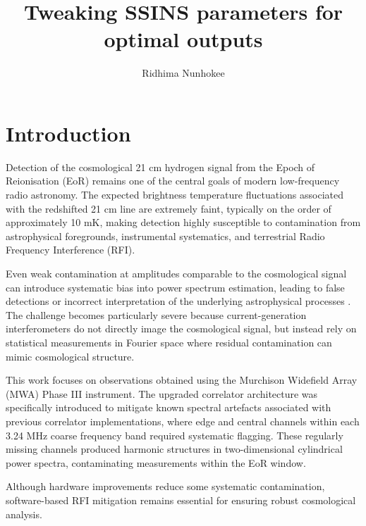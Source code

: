\documentclass{article}
\title{Tweaking SSINS parameters for optimal outputs}
\author{Ridhima Nunhokee}
\date{}
\begin{document}
\maketitle

\section{Introduction}

Detection of the cosmological 21 cm hydrogen signal from the Epoch of Reionisation (EoR) remains one of the central goals of modern low-frequency radio astronomy. The expected brightness temperature fluctuations associated with the redshifted 21 cm line are extremely faint, typically on the order of approximately 10 mK, making detection highly susceptible to contamination from astrophysical foregrounds, instrumental systematics, and terrestrial Radio Frequency Interference (RFI).

Even weak contamination at amplitudes comparable to the cosmological signal can introduce systematic bias into power spectrum estimation, leading to false detections or incorrect interpretation of the underlying astrophysical processes \cite{Nunhokee2024, Kolopanis2019, Wilensky2019}. The challenge becomes particularly severe because current-generation interferometers do not directly image the cosmological signal, but instead rely on statistical measurements in Fourier space where residual contamination can mimic cosmological structure.

This work focuses on observations obtained using the Murchison Widefield Array (MWA) Phase III instrument. The upgraded correlator architecture was specifically introduced to mitigate known spectral artefacts associated with previous correlator implementations, where edge and central channels within each 3.24 MHz coarse frequency band required systematic flagging. These regularly missing channels produced harmonic structures in two-dimensional cylindrical power spectra, contaminating measurements within the EoR window.

Although hardware improvements reduce some systematic contamination, software-based RFI mitigation remains essential for ensuring robust cosmological analysis.

\end{document}
